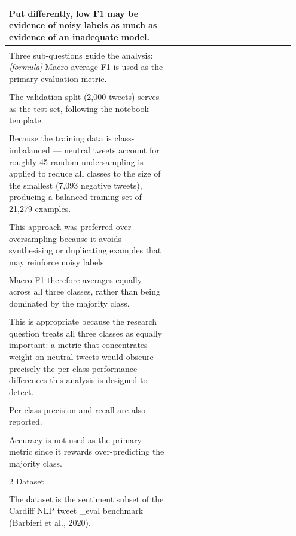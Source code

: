 \documentclass[11pt]{article}
\begin{document}
\begin{longtable}{|p{0.55\linewidth}|p{0.40\linewidth}|}
\hline
Put differently, low F1 may be evidence of noisy labels as much as evidence of an inadequate model. & \\[2pt]
\hline
\rule{0pt}{3.5cm} & \\
\hline
Three sub-questions guide the analysis: \textit{[formula]} Macro average F1 is used as the primary evaluation metric. & \\[2pt]
\hline
\rule{0pt}{3.5cm} & \\
\hline
The validation split (2,000 tweets) serves as the test set, following the notebook template. & \\[2pt]
\hline
\rule{0pt}{3.5cm} & \\
\hline
Because the training data is class-imbalanced --- neutral tweets account for roughly 45 random undersampling is applied to reduce all classes to the size of the smallest (7,093 negative tweets), producing a balanced training set of 21,279 examples. & \\[2pt]
\hline
\rule{0pt}{3.5cm} & \\
\hline
This approach was preferred over oversampling because it avoids synthesising or duplicating examples that may reinforce noisy labels. & \\[2pt]
\hline
\rule{0pt}{3.5cm} & \\
\hline
Macro F1 therefore averages equally across all three classes, rather than being dominated by the majority class. & \\[2pt]
\hline
\rule{0pt}{3.5cm} & \\
\hline
This is appropriate because the research question treats all three classes as equally important: a metric that concentrates weight on neutral tweets would obscure precisely the per-class performance differences this analysis is designed to detect. & \\[2pt]
\hline
\rule{0pt}{3.5cm} & \\
\hline
Per-class precision and recall are also reported. & \\[2pt]
\hline
\rule{0pt}{3.5cm} & \\
\hline
Accuracy is not used as the primary metric since it rewards over-predicting the majority class. & \\[2pt]
\hline
\rule{0pt}{3.5cm} & \\
\hline
2 Dataset & \\[2pt]
\hline
\rule{0pt}{3.5cm} & \\
\hline
The dataset is the sentiment subset of the Cardiff NLP tweet \_eval benchmark (Barbieri et al., 2020). & \\[2pt]

\end{longtable}
\end{document}
